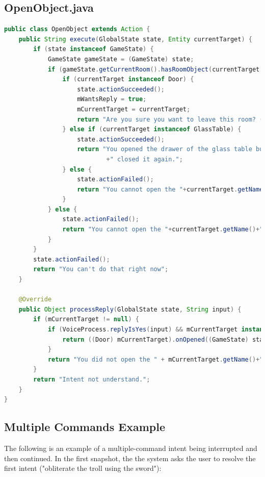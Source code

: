 \documentclass[12pt]{article}
\begin{document}
\newpage
\subsection{OpenObject.java}
\label{appendix:open-object}
\begin{lstlisting}[language=Java]
public class OpenObject extends Action {
    public String execute(GlobalState state, Entity currentTarget) {
        if (state instanceof GameState) {
            GameState gameState = (GameState) state;
            if (gameState.getCurrentRoom().hasRoomObject(currentTarget.getName())) {
                if (currentTarget instanceof Door) {
                    state.actionSucceeded();
                    mWantsReply = true;
                    mCurrentTarget = currentTarget;
                    return "Are you sure you want to leave this room? (yes/no)";
                } else if (currentTarget instanceof GlassTable) {
                    state.actionSucceeded();
                    return "You opened the drawer of the glass table but nothing is inside. You"
                            +" closed it again.";
                } else {
                    state.actionFailed();
                    return "You cannot open the "+currentTarget.getName()+".";
                }
            } else {
                state.actionFailed();
                return "You cannot open the "+currentTarget.getName()+".";
            }
        }
        state.actionFailed();
        return "You can't do that right now";
    }

    @Override
    public Object processReply(GlobalState state, String input) {
        if (mCurrentTarget != null) {
            if (VoiceProcess.replyIsYes(input) && mCurrentTarget instanceof Door) {
                return ((Door) mCurrentTarget).onOpened((GameState) state);
            }
            return "You did not open the " + mCurrentTarget.getName()+".";
        }
        return "Intent not understand.";
    }
}

\end{lstlisting}

\newpage
\subsection{Multiple Commands Example}
\label{appendix:multiple-commands-ex}
The following is an example of a multiple-command intent being interrupted and then continued. In the first snapshot, the the system asks the user to resolve the first intent ("obliterate the troll using the sword"):
\end{document}
